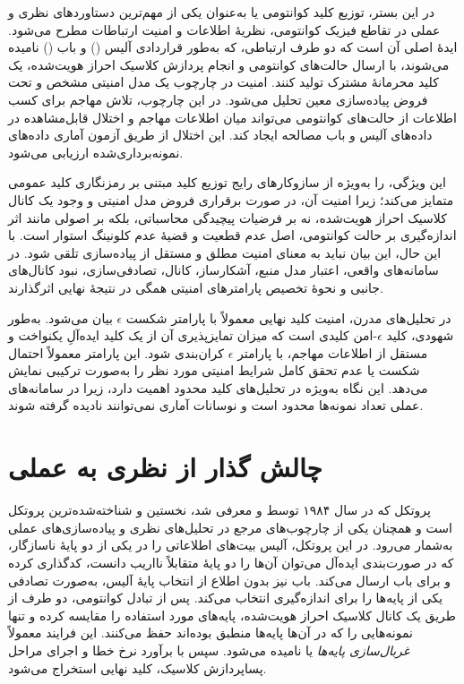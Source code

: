 در این بستر، توزیع کلید کوانتومی یا  به‌عنوان یکی از مهم‌ترین دستاوردهای نظری و عملی در تقاطع فیزیک کوانتومی، نظریهٔ اطلاعات و امنیت ارتباطات مطرح می‌شود. ایدهٔ اصلی  آن است که دو طرف ارتباطی، که به‌طور قراردادی آلیس () و باب () نامیده می‌شوند، با ارسال حالت‌های کوانتومی و انجام پردازش کلاسیک احراز هویت‌شده، یک کلید محرمانهٔ مشترک تولید کنند. امنیت  در چارچوب یک مدل امنیتی مشخص و تحت فروض پیاده‌سازی معین تحلیل می‌شود. در این چارچوب، تلاش مهاجم برای کسب اطلاعات از حالت‌های کوانتومی می‌تواند میان اطلاعات مهاجم و اختلال قابل‌مشاهده در داده‌های آلیس و باب مصالحه ایجاد کند. این اختلال از طریق آزمون آماری داده‌های نمونه‌برداری‌شده ارزیابی می‌شود.

این ویژگی،  را به‌ویژه از سازوکارهای رایج توزیع کلید مبتنی بر رمزنگاری کلید عمومی متمایز می‌کند؛ زیرا امنیت آن، در صورت برقراری فروض مدل امنیتی و وجود یک کانال کلاسیک احراز هویت‌شده، نه بر فرضیات پیچیدگی محاسباتی، بلکه بر اصولی مانند اثر اندازه‌گیری بر حالت کوانتومی، اصل عدم قطعیت و قضیهٔ عدم کلونینگ استوار است. با این حال، این بیان نباید به معنای امنیت مطلق و مستقل از پیاده‌سازی تلقی شود. در سامانه‌های واقعی، اعتبار مدل منبع، آشکارساز، کانال، تصادفی‌سازی، نبود کانال‌های جانبی و نحوهٔ تخصیص پارامترهای امنیتی همگی در نتیجهٔ نهایی اثرگذارند.

در تحلیل‌های مدرن، امنیت کلید نهایی معمولاً با پارامتر شکست \(\epsilon\) بیان می‌شود. به‌طور شهودی، کلید \(\epsilon\)-امن کلیدی است که میزان تمایزپذیری آن از یک کلید ایده‌آلِ یکنواخت و مستقل از اطلاعات مهاجم، با پارامتر \(\epsilon\) کران‌بندی شود. این پارامتر معمولاً احتمال شکست یا عدم تحقق کامل شرایط امنیتی مورد نظر را به‌صورت ترکیبی نمایش می‌دهد. این نگاه به‌ویژه در تحلیل‌های کلید محدود اهمیت دارد، زیرا در سامانه‌های عملی تعداد نمونه‌ها محدود است و نوسانات آماری نمی‌توانند نادیده گرفته شوند.

\section{چالش گذار از  نظری به  عملی}

پروتکل  که در سال ۱۹۸۴ توسط  و  معرفی شد، نخستین و شناخته‌شده‌ترین پروتکل  است و همچنان یکی از چارچوب‌های مرجع در تحلیل‌های نظری و پیاده‌سازی‌های عملی به‌شمار می‌رود. در این پروتکل، آلیس بیت‌های اطلاعاتی را در یکی از دو پایهٔ ناسازگار، که در صورت‌بندی ایده‌آل می‌توان آن‌ها را دو پایهٔ متقابلاً نااریب دانست، کدگذاری کرده و برای باب ارسال می‌کند. باب نیز بدون اطلاع از انتخاب پایهٔ آلیس، به‌صورت تصادفی یکی از پایه‌ها را برای اندازه‌گیری انتخاب می‌کند. پس از تبادل کوانتومی، دو طرف از طریق یک کانال کلاسیک احراز هویت‌شده، پایه‌های مورد استفاده را مقایسه کرده و تنها نمونه‌هایی را که در آن‌ها پایه‌ها منطبق بوده‌اند حفظ می‌کنند. این فرایند معمولاً \textit{غربال‌سازی پایه‌ها} یا  نامیده می‌شود. سپس با برآورد نرخ خطا و اجرای مراحل پساپردازش کلاسیک، کلید نهایی استخراج می‌شود.

